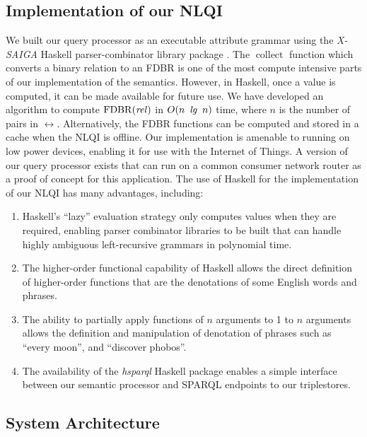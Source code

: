 \documentclass[../main.tex]{subfiles}
\begin{document}
\begin{refsection}
\section{Implementation of our NLQI}
\label{webist2019journal:implementation}
We built our query processor as an executable attribute grammar using the {\em X-SAIGA} Haskell parser-combinator library package \cite{xsaiga}.
The $\operatorname{collect}$ function which converts a binary relation to an FDBR is one of the most
compute intensive parts of our implementation of the semantics. However, in Haskell, once a value is
computed, it can be made available for future use. We have developed an algorithm to compute
$\operatorname{FDBR}({\operatorname{\mathit{rel}}})$ in $O(n\ \operatorname{\mathit{lg}}\ n)$ time, where $n$ is the number of pairs in $\rel$.
Alternatively, the FDBR functions can be computed and stored in a cache when the NLQI is offline.
Our implementation is amenable to running on low power devices, enabling it for use with the Internet of Things. A version of our query processor exists that can run on a common consumer network router as a proof of concept for this application.
The use of Haskell for the implementation of our NLQI has many advantages, including:
\begin{enumerate}
	\setlength\itemsep{0em}
	\item Haskell's ``lazy'' evaluation strategy only computes values when they are required, enabling parser combinator
	libraries to be built that can handle highly ambiguous left-recursive grammars in polynomial time.
	\item The higher-order functional capability of Haskell allows the direct definition of higher-order
	functions that are the denotations of some English words and phrases.
	\item The ability to partially apply functions of $n$ arguments to 1 to $n$ arguments allows the
	definition and manipulation of denotation of phrases such as ``every moon'', and ``discover
	phobos''.
	\item The availability of the \textit{hsparql} \cite{hsparql} Haskell package enables a simple interface between our semantic processor and SPARQL endpoints to our triplestores.
\end{enumerate}



\subsection{System Architecture}
\label{webist2019journal:architecture}


\end{refsection}
\end{document}

